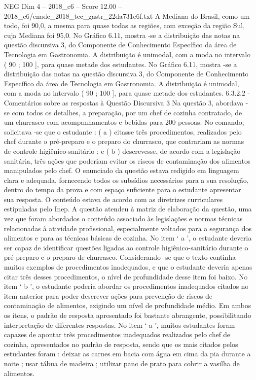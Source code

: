 \begin{textsample}{NEG Dim 4 – 2018\_c6 – Score 12.00 – 2018\_c6/enade\_2018\_tec\_gastr\_22da731e6f.txt}
A Mediana do Brasil, como um todo, foi 90,0, a mesma para quase todas as regiões, com exceção da região Sul, cuja Mediana foi 95,0.
No Gráfico 6.11, mostra -se a distribuição das notas na questão discursiva 3, do Componente de Conhecimento Específico da área de Tecnologia em Gastronomia.
A distribuição é unimodal, com a moda no intervalo ( 90 ; 100 ], para quase metade dos estudantes.
No Gráfico 6.11, mostra -se a distribuição das notas na questão discursiva 3, do Componente de Conhecimento Específico da área de Tecnologia em Gastronomia.
A distribuição é unimodal, com a moda no intervalo ( 90 ; 100 ], para quase metade dos estudantes. 6.3.2.2 - Comentários sobre as respostas à Questão Discursiva 3 Na questão 3, abordava -se com todos os detalhes, a preparação, por um chef de cozinha contratado, de um churrasco com acompanhamentos e bebidas para 200 pessoas.
No comando, solicitava -se que o estudante : ( a ) citasse três procedimentos, realizados pelo chef durante o pré-preparo e o preparo do churrasco, que contrariam as normas de controle higiênico-sanitário ; e ( b ) descrevesse, de acordo com a legislação sanitária, três ações que poderiam evitar os riscos de contaminação dos alimentos manipulados pelo chef.
O enunciado da questão estava redigido em linguagem clara e adequada, fornecendo todos os subsídios necessários para a sua resolução, dentro do tempo da prova e com espaço suficiente para o estudante apresentar sua resposta.
O conteúdo estava de acordo com as diretrizes curriculares estipuladas pelo Inep.
A questão atendeu à matriz de elaboração da questão, uma vez que foram abordados o conteúdo associado às legislações e normas técnicas relacionadas à atividade profissional, especialmente voltados para a segurança dos alimentos e para as técnicas básicas de cozinha.
No item ‘ a ’, o estudante deveria ser capaz de identificar questões ligadas ao controle higiênico-sanitário durante o pré-preparo e o preparo de churrasco.
Considerando -se que o texto continha muitos exemplos de procedimentos inadequados, e que o estudante deveria apenas citar três desses procedimentos, o nível de profundidade desse item foi baixo.
No item ‘ b ’, o estudante poderia abordar os procedimentos inadequados citados no item anterior para poder descrever ações para prevenção de riscos de contaminação de alimentos, exigindo um nível de profundidade médio.
Em ambos os itens, o padrão de resposta apresentado foi bastante abrangente, possibilitando interpretação de diferentes respostas.
No item ‘ a ’, muitos estudantes foram capazes de apontar três procedimentos inadequados realizados pelo chef de cozinha, apresentados no padrão de resposta, sendo que os mais citados pelos estudantes foram : deixar as carnes em bacia com água em cima da pia durante a noite ; usar tábua de madeira ; utilizar pano de prato para cobrir a vasilha de alimentos.

\end{textsample}
